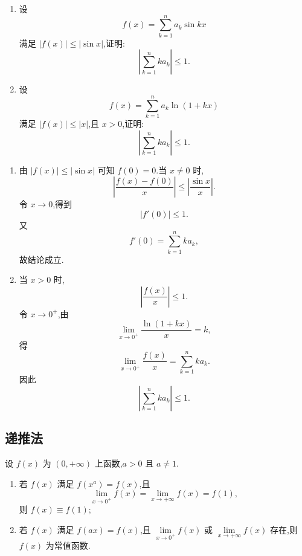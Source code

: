 \begin{example}
    \begin{enumerate}
        \item 设
              \[
                  f(x)=\sum\limits_{k=1}^n a_k\sin kx
              \]
              满足 $|f(x)|\leq|\sin x|$,证明:
              \[
                  \left|\sum\limits_{k=1}^n ka_k\right|\leq1.
              \]
        \item 设
              \[
                  f(x)=\sum\limits_{k=1}^n a_k\ln(1+kx)
              \]
              满足 $|f(x)|\leq|x|$,且 $x>0$,证明:
              \[
                  \left|\sum\limits_{k=1}^n ka_k\right|\leq1.
              \]
    \end{enumerate}
\end{example}
\exampleblank

\begin{solution}
    \leavevmode
    \begin{enumerate}
        \item 由 $|f(x)|\leq|\sin x|$ 可知 $f(0)=0$.当 $x\neq0$ 时,
              \[
                  \left|\dfrac{f(x)-f(0)}{x}\right|
                  \leq\left|\dfrac{\sin x}{x}\right|.
              \]
              令 $x\to0$,得到
              \[
                  |f'(0)|\leq1.
              \]
              又
              \[
                  f'(0)=\sum\limits_{k=1}^{n}ka_k,
              \]
              故结论成立.
        \item 当 $x>0$ 时,
              \[
                  \left|\dfrac{f(x)}{x}\right|\leq1.
              \]
              令 $x\to0^+$,由
              \[
                  \displaystyle\lim\limits_{x\to0^+}\dfrac{\ln(1+kx)}{x}=k,
              \]
              得
              \[
                  \displaystyle\lim\limits_{x\to0^+}\dfrac{f(x)}{x}
                  =
                  \sum\limits_{k=1}^{n}ka_k.
              \]
              因此
              \[
                  \left|\sum\limits_{k=1}^{n}ka_k\right|\leq1.
              \]
    \end{enumerate}
\end{solution}

\subsection{递推法}

\begin{example}
    设 $f(x)$ 为 $(0,+\infty)$ 上函数,$a>0$ 且 $a\neq1$.
    \begin{enumerate}
        \item 若 $f(x)$ 满足 $f(x^a)=f(x)$,且
              \[
                  \displaystyle\lim\limits_{x\to0^+}f(x)
                  =\lim\limits_{x\to+\infty}f(x)
                  =f(1),
              \]
              则 $f(x)\equiv f(1)$;
        \item 若 $f(x)$ 满足 $f(ax)=f(x)$,且
              $\displaystyle\lim\limits_{x\to0^+}f(x)$ 或
              $\displaystyle\lim\limits_{x\to+\infty}f(x)$ 存在,则 $f(x)$ 为常值函数.
    \end{enumerate}
\end{example}
\exampleblank

